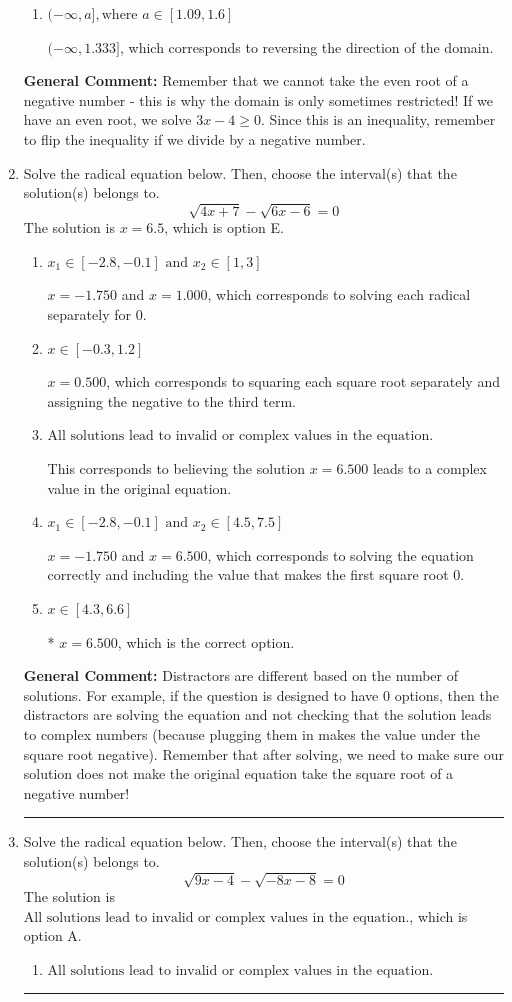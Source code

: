 \documentclass{extbook}[14pt]
\newcommand{\litem}[1]{\item #1

\rule{\textwidth}{0.4pt}}
\begin{document}
\begin{enumerate}
{\begin{enumerate}[label=\Alph*.]
* $[1.333, \infty)$, which is the correct option.
\item \( (-\infty, a], \text{where } a \in [1.09, 1.6] \)

 $(-\infty, 1.333]$, which corresponds to reversing the direction of the domain.
\end{enumerate}

\textbf{General Comment:} Remember that we cannot take the even root of a negative number - this is why the domain is only sometimes restricted! If we have an even root, we solve $3 x - 4 \geq 0$. Since this is an inequality, remember to flip the inequality if we divide by a negative number.
}
\litem{
Solve the radical equation below. Then, choose the interval(s) that the solution(s) belongs to.
\[ \sqrt{4 x + 7} - \sqrt{6 x - 6} = 0 \]The solution is \( x = 6.5 \), which is option E.\begin{enumerate}[label=\Alph*.]
\item \( x_1 \in [-2.8, -0.1] \text{ and } x_2 \in [1,3] \)

$x = -1.750$ and $x = 1.000$, which corresponds to solving each radical separately for 0.
\item \( x \in [-0.3,1.2] \)

$x = 0.500$, which corresponds to squaring each square root separately and assigning the negative to the third term.
\item \( \text{All solutions lead to invalid or complex values in the equation.} \)

This corresponds to believing the solution $x = 6.500$ leads to a complex value in the original equation.
\item \( x_1 \in [-2.8, -0.1] \text{ and } x_2 \in [4.5,7.5] \)

$x = -1.750$ and $x = 6.500$, which corresponds to solving the equation correctly and including the value that makes the first square root 0.
\item \( x \in [4.3,6.6] \)

* $x = 6.500$, which is the correct option.
\end{enumerate}

\textbf{General Comment:} Distractors are different based on the number of solutions. For example, if the question is designed to have 0 options, then the distractors are solving the equation and not checking that the solution leads to complex numbers (because plugging them in makes the value under the square root negative). Remember that after solving, we need to make sure our solution does not make the original equation take the square root of a negative number!
}
\litem{
Solve the radical equation below. Then, choose the interval(s) that the solution(s) belongs to.
\[ \sqrt{9 x - 4} - \sqrt{-8 x - 8} = 0 \]The solution is \( \text{All solutions lead to invalid or complex values in the equation.} \), which is option A.\begin{enumerate}[label=\Alph*.]
\item \( \text{All solutions lead to invalid or complex values in the equation.} \)


\end{enumerate}}
\end{enumerate}
\end{document}

